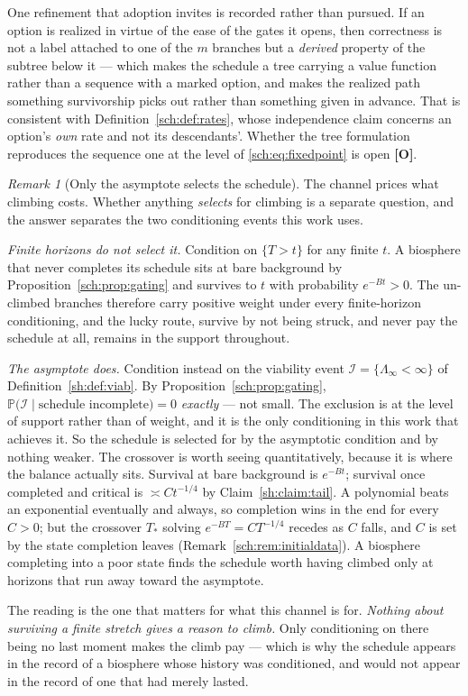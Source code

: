 \documentclass[11pt]{article}
\numberwithin{equation}{section}
\theoremstyle{plain}
\theoremstyle{definition}
\theoremstyle{remark}
\newtheorem{remark}[theorem]{Remark}
\newcommand{\PP}{\mathbb{P}}
\newcommand{\Imm}{\mathcal{I}}
\begin{document}
One refinement that adoption invites is recorded rather than pursued. If
an option is realized in virtue of the ease of the gates it opens, then
correctness is not a label attached to one of the $m$ branches but a
\emph{derived} property of the subtree below it --- which makes the
schedule a tree carrying a value function rather than a sequence with a
marked option, and makes the realized path something survivorship picks
out rather than something given in advance. That is consistent with
Definition~\ref{sch:def:rates}, whose independence claim concerns an
option's \emph{own} rate and not its descendants'. Whether the tree
formulation reproduces the sequence one at the level of
\eqref{sch:eq:fixedpoint} is open \textbf{[O]}.

\begin{remark}[Only the asymptote selects the schedule]
\label{sch:rem:asymptote}
The channel prices what climbing costs. Whether anything \emph{selects}
for climbing is a separate question, and the answer separates the two
conditioning events this work uses.

\emph{Finite horizons do not select it.} Condition on $\{T>t\}$ for any
finite $t$. A biosphere that never completes its schedule sits at bare
background by Proposition~\ref{sch:prop:gating} and survives to $t$ with
probability $e^{-Bt}>0$. The un-climbed branches therefore carry
positive weight under every finite-horizon conditioning, and the lucky
route, survive by not being struck, and never pay the schedule at all, remains in the support throughout.

\emph{The asymptote does.} Condition instead on the viability event
$\Imm=\{\Lambda_\infty<\infty\}$ of Definition~\ref{sh:def:viab}. By
Proposition~\ref{sch:prop:gating},
$\PP\bigl(\Imm\mid\text{schedule incomplete}\bigr)=0$ \emph{exactly} ---
not small. The exclusion is at the level of support rather than of
weight, and it is the only conditioning in this work that achieves it. So the schedule is selected for by the asymptotic condition and by
nothing weaker. The crossover is worth seeing quantitatively, because it
is where the balance actually sits. Survival at bare background is
$e^{-Bt}$; survival once completed and critical is $\asymp Ct^{-1/4}$ by
Claim~\ref{sh:claim:tail}. A polynomial beats an exponential eventually
and always, so completion wins in the end for every $C>0$; but the
crossover $T_\ast$ solving $e^{-BT}=CT^{-1/4}$ recedes as $C$ falls, and
$C$ is set by the state completion leaves
(Remark~\ref{sch:rem:initialdata}). A biosphere completing into a poor
state finds the schedule worth having climbed only at horizons that run
away toward the asymptote.

The reading is the one that matters for what this channel is for.
\emph{Nothing about surviving a finite stretch gives a reason to climb.}
Only conditioning on there being no last moment makes the climb pay ---
which is why the schedule appears in the record of a biosphere whose
history was conditioned, and would not appear in the record of one that
had merely lasted.
\end{remark}
\end{document}
